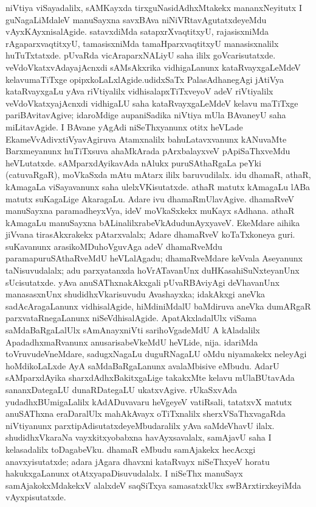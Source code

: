 niVtiya viSayadalilx, sAMKayxda tirxguNasidAdhxMtakekx mananxNeyitutx I guNa\-gaLiMdaleV manuSayxna savxBAva niNiVRtavAgutatxdeyeMdu vAyxKAyxnisalAgide. satavxdiMda satapxrXvaq\break\-titxyU, rajasisxniMda rAgaparxvaqtitxyU, tamasisxniMda tamaHparxvaqtitxyU manasisxnalilx huTuTx\-tatxde. pUvaRda vicAraparxNALiyU saha ililx goVcarisutatxde. veVdoVkatxvAda\break yajAcnxdi sAMsAkxrika vidhigaLanunx kataRvayxgaLeMdeV kelavumaTiTxge opipxkoLaLxlAgide.\break udidxSaTx PalasAdhanegAgi jAtiVya kataRvayxgaLu yAva riVtiyalilx vidhisalapxTiTxveyoV adeV riVtiyalilx veVdoVkatxyajAcnxdi vidhigaLU saha kataRvayxgaLeMdeV kelavu maTiTxge pari\-BAvitavAgive; idaroMdige aupaniSadika niVtiya mUla BAvaneyU saha miLita\-vAgide. I BAvane yAgAdi niSeThxyanunx otitx heVLade EkameVvAdivxtiVyavAgiruva Atamxnalilx bahuLatavxvanunx kANuvaMte Barxmeyanunx huTiTxsuva ahaMkArada pArxbalayxveV pApiSaThxveMdu heVLutatxde. sAMparxdAyikavAda nAlukx puruSAthaRgaLa peYki (catu\break\-vaRgaR), moVkaSxda mAtu mAtarx ililx baruvudilalx. idu dhamaR, athaR, kAmagaLa viSayavanunx saha ulelxVKisutatxde. athaR matutx kAmagaLu lABa matutx suKagaLige AkaragaLu. Adare ivu dhamaRmUlavAgive. dhamaRveV manuSayxna paramadheyxVya, ideV moVkaSxkekx muKayx sAdhana. athaR kAmagaLu manuSayxna bALinalilxrabeVkAdudu\break nAyxyaveV. EkeMdare aihika jiVvana tirasAkxrakekx pAtarxvalalx; Adare dhamaRveV koTaTx\break koneya guri. suKavanunx arasikoMDuhoVguvAga adeV dhamaRveMdu parama\-puruSAthaRveMdU heVLalAgadu; dhamaRveMdare keVvala Aseyanunx taNisuvudalalx; adu parxyatanxda hoVrATavanUnx duHKasahiSuNxteyanUnx sUcisutatxde. yAva anu\-SAThxnakAkxgali pUvaRBAviyAgi deVhavanUnx manasasxnUnx shudidhxVkarisuvudu Avashayxka; idakAkxgi aneVka sadAcAragaLanunx vidhisalAgide, hiMdiniMdalU baMdiruva aneVka dumARgaR parxvataRnegaLanunx niSeVdhisalAgide. ApatAkxladalUlx viSama saMdaBaR\break\-gaLalUlx sAmAnayxniVti sarihoVgadeMdU A kAladalilx ApadadhxmaRvanunx anusarisa\break\-beVkeMdU heVLide, nija. idariMda toVruvudeVneMdare, sadugxNagaLu duguRNagaLU oMdu niyamakekx neleyAgi hoMdikoLaLxde AyA saMdaBaRgaLanunx avalaMbisive eMbudu. AdarU sAMparxdAyika sharxdAdhxBakitxgaLige takakxMte kelavu mUlaBUtavAda sananxDategaLU dunaRDategaLU ukatxvAgive. rUkaSxvAda yudadhxBUmigaLalilx kAdADu\-vavaru heVgeyeV vatiRsali, tatatxvX matutx anuSAThxna eraDaralUlx mahAkAvayx oTiTx\-nalilx sherxVSaThxvagaRda niVtiyanunx parxtipAdisutatxdeyeMbudaralilx yAva saMdeVhavU ilalx. shudidhxV\-karaNa vayxkitxyobabxna havAyxsavalalx, samAjavU saha I kelasadalilx toDagabeVku. dhamaR eMbudu samAjakekx hecAcxgi anavxyisutatxde; adara jAgara dhavxni kataRvayx niSeThxyeV horatu hakukxgaLanunx otAtxyapaDisuvudalalx. I niSeThx manuSayx samAjakokxMdakekxV alalxdeV saqSiTxya samasatxkUkx swBArxtirxkeyiMda vAyxpisutatxde.

